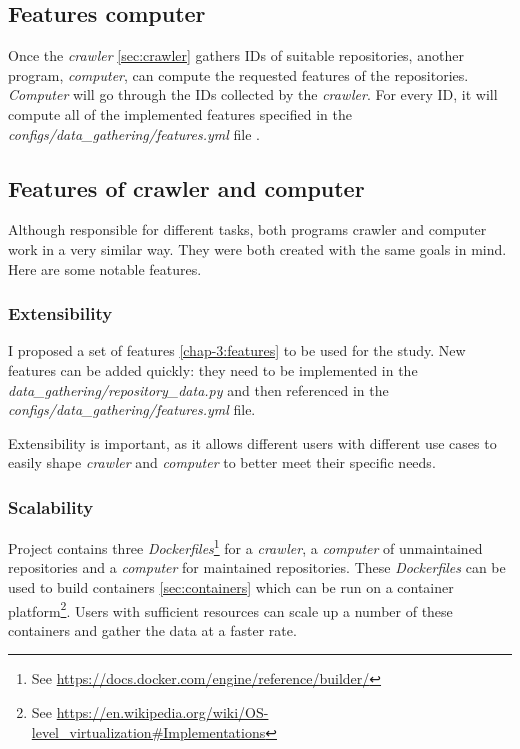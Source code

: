 \subsection{Features computer}
\label{sec:computer}

Once the \emph{crawler} \ref{sec:crawler} gathers IDs of suitable repositories, another program, \emph{computer}, can compute the requested features of the repositories.
\emph{Computer} will go through the IDs collected by the \emph{crawler}.
For every ID, it will compute all of the implemented features specified in the \emph{configs/data\_gathering/features.yml} file \cite{repo}.

\subsection{Features of crawler and computer}

Although responsible for different tasks, both programs crawler and computer work in a very similar way.
They were both created with the same goals in mind.
Here are some notable features.

\subsubsection{Extensibility}

I proposed a set of features \ref{chap-3:features} to be used for the study.
New features can be added quickly:
they need to be implemented in the \emph{data\_gathering/repository\_data.py} and then referenced in the \emph{configs/data\_gathering/features.yml} file.

Extensibility is important, as it allows different users with different use cases to easily shape \emph{crawler} and \emph{computer} to better meet their specific needs.

\subsubsection{Scalability}

Project contains three \emph{Dockerfiles}\footnote{See \url{https://docs.docker.com/engine/reference/builder/}} for a \emph{crawler}, a \emph{computer} of unmaintained repositories and a \emph{computer} for maintained repositories.
These \emph{Dockerfiles} can be used to build containers \ref{sec:containers} which can be run on a container platform\footnote{See \url{https://en.wikipedia.org/wiki/OS-level_virtualization\#Implementations}}.
Users with sufficient resources can scale up a number of these containers and gather the data at a faster rate.

